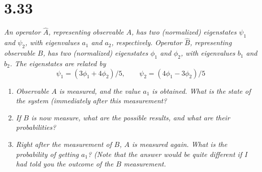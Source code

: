 \documentclass[12pt]{article}
\begin{document}
\section*{3.33}
\emph{An operator $\hat{A}$, representing observable $A$, has two (normalized) eigenstates $\psi_1$ and $\psi_2$, with eigenvalues $a_1$ and $a_2$, respectively. Operator $\hat{B}$, representing observable $B$, has two (normalized) eigenstates $\phi_1$ and $\phi_2$, with eigenvalues $b_1$ and $b_2$. The eigenstates are related by}
\[\psi_1 = (3\phi_1 + 4\phi_2)/5, \qquad \psi_2 = (4\phi_1 - 3\phi_2)/5\]
\begin{enumerate}[label=\alph*)]
\item \emph{Observable $A$ is measured, and the value $a_1$ is obtained. What is the state of the system (immediately after this measurement?}\bigskip

\item \emph{If $B$ is now measure, what are the possible results, and what are their probabilities?}\bigskip

\item \emph{Right after the measurement of $B$, $A$ is measured again. What is the probability of getting $a_1$? (Note that the answer would be quite different if I had told you the outcome of the $B$ measurement.}
\end{enumerate}
\end{document}
